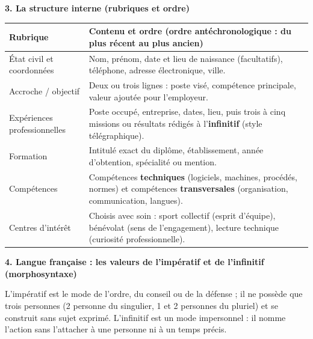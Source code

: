 \documentclass[11pt]{article}
\newcommand{\cle}[1]{{\popxbold\color{popdark}#1}}
\begin{document}
\textbf{3. La structure interne (rubriques et ordre)}\par
\begin{center}
\begin{tabularx}{\linewidth}{|l|X|}\hline
\rowcolor{popblueL}
\textbf{Rubrique} & \textbf{Contenu et ordre (ordre antéchronologique : du plus récent au plus ancien)} \\\hline
\cle{État civil et coordonnées} & Nom, prénom, date et lieu de naissance (facultatifs), téléphone, adresse électronique, ville. \\\hline
\cle{Accroche / objectif} & Deux ou trois lignes : poste visé, compétence principale, valeur ajoutée pour l'employeur. \\\hline
\cle{Expériences professionnelles} & Poste occupé, entreprise, dates, lieu, puis trois à cinq missions ou résultats rédigés à l'\textbf{infinitif} (style télégraphique). \\\hline
\cle{Formation} & Intitulé exact du diplôme, établissement, année d'obtention, spécialité ou mention. \\\hline
\cle{Compétences} & Compétences \textbf{techniques} (logiciels, machines, procédés, normes) et compétences \textbf{transversales} (organisation, communication, langues). \\\hline
\cle{Centres d'intérêt} & Choisis avec soin : sport collectif (esprit d'équipe), bénévolat (sens de l'engagement), lecture technique (curiosité professionnelle). \\\hline
\end{tabularx}
\end{center}

\textbf{4. Langue française : les valeurs de l'impératif et de l'infinitif (morphosyntaxe)}\par

\begin{definition}
L'\cle{impératif} est le mode de l'ordre, du conseil ou de la défense ; il ne possède que trois personnes (2 personne du singulier, 1 et 2 personnes du pluriel) et se construit sans sujet exprimé. L'\cle{infinitif} est un mode impersonnel : il nomme l'action sans l'attacher à une personne ni à un temps précis.
\end{definition}
\end{document}
